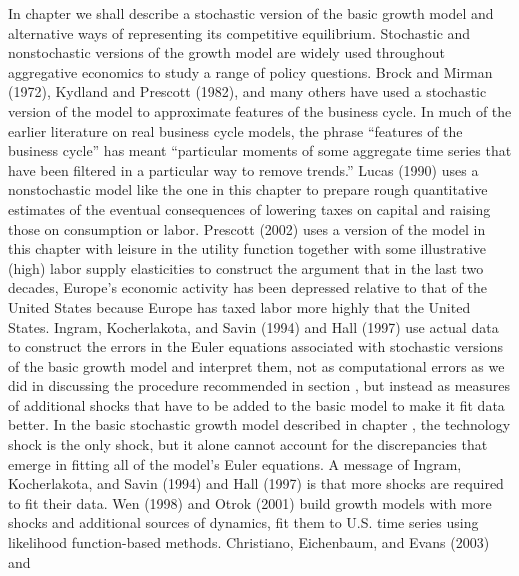    In chapter  we shall describe a stochastic version of the basic growth
model and alternative ways of representing its competitive equilibrium.
 Stochastic and nonstochastic versions
of the growth model are widely used throughout aggregative
economics to study a range of policy questions. Brock and Mirman
(1972), Kydland and Prescott (1982), and many others have used  a
stochastic version of the model to approximate features of the
business cycle. In much of the earlier literature on real
business cycle models, the phrase ``features of the business
cycle'' has meant ``particular moments of some aggregate time series
that have been filtered in a particular way to remove trends.''
Lucas (1990) uses a nonstochastic model like the one in this chapter
to prepare rough quantitative estimates of the eventual
consequences of lowering taxes on capital and raising those on
consumption or labor. Prescott (2002) uses a version of the model
in this chapter with leisure in the utility function together with
some illustrative
 (high) labor supply elasticities to construct the argument that in the last two
decades, Europe's economic activity has been depressed relative to
that of the United States because Europe has taxed labor more highly that the
United States.  Ingram, Kocherlakota, and Savin (1994) and  Hall (1997)
use actual data to construct the errors in the Euler equations
associated with stochastic versions of the basic growth model and
interpret them,  not as computational errors as we did  in discussing  the procedure
recommended in section
, but instead  as measures of additional shocks that have to be added to the basic model to make it fit  data  better.
In the basic stochastic growth model described  in chapter
, the technology shock  is the only shock, but it alone 
cannot  account for the discrepancies that emerge in
fitting all of the model's Euler equations.   A
message of  Ingram, Kocherlakota, and Savin (1994) and  Hall
(1997) is
 that more shocks are required to fit  their  data.
Wen (1998) and Otrok (2001) build growth models with more shocks
and additional sources of dynamics, fit them to U.S. time series
using likelihood function-based methods.   Christiano, Eichenbaum, and Evans (2003) and
